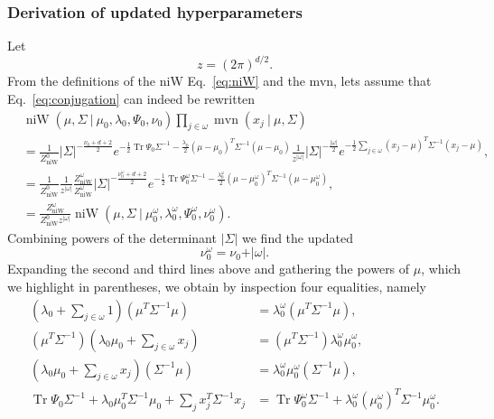 \documentclass[11pt, oneside]{article}   	%
\DeclareMathOperator{\Tr}{Tr}
\DeclareMathOperator{\niW}{niW}
\begin{document}
\subsubsection{Derivation of updated hyperparameters}
Let
$$z = (2\pi)^{d/2}.$$
From the definitions of the niW Eq.~\ref{eq:niW} and the mvn, lets assume that Eq.~\ref{eq:conjugation} can indeed be rewritten
\begin{equation}\begin{split}
&\niW(\mu, \Sigma~\vert~ \mu_0, \lambda_0,\Psi_0,\nu_0)\prod_{j\in\omega}\operatorname{mvn}(x_j~\vert~\mu,\Sigma)\\
& = \frac{1}{Z^0_{\niW}}\vert\Sigma\vert^{-\frac{\nu_0 + d + 2}{2}} e^{-\frac{1}{2}\Tr\Psi_0\Sigma^{-1}-\frac{\lambda_0}{2}(\mu - \mu_0)^T \Sigma^{-1}(\mu - \mu_0)}\frac{1}{z^{\vert\omega\vert}}\vert\Sigma\vert^{-\frac{\vert\omega\vert}{2}} e^{-\frac{1}{2}\sum_{j\in\omega}(x_j - \mu)^T\Sigma^{-1}(x_j - \mu)},\\
&=  \frac{1}{Z^0_{\niW}}\frac{1}{z^{\vert\omega\vert}} \frac{Z^\omega_{\niW}}{Z^\omega_{\niW}}\vert\Sigma\vert^{-\frac{\nu_0^\omega + d + 2}{2}}e^{-\frac{1}{2}\Tr\Psi_0^\omega\Sigma^{-1} - \frac{\lambda_0^\omega}{2}(\mu - \mu_0^\omega)^T\Sigma^{-1}(\mu - \mu_0^\omega)},\\
&= \frac{Z^\omega_{\niW}}{Z^0_{\niW} z^{\vert\omega\vert}} \niW(\mu,\Sigma~\vert~\mu_0^\omega,\lambda_0^\omega,\Psi_0^\omega,\nu_0^\omega).
\label{eq:niW}\end{split}\end{equation}
Combining powers of the determinant $\vert\Sigma\vert$ we find the updated
$$\nu_0^\omega = \nu_0 + \vert\omega\vert.$$
Expanding the second and third lines above and gathering the powers of $\mu$, which we highlight in parentheses, we obtain by inspection four equalities, namely
\begin{equation}\begin{split}
(\lambda_0 + \sum_{j\in\omega} 1)\left(\mu^T\Sigma^{-1}\mu\right) &= \lambda_0^\omega\left(\mu^T\Sigma^{-1}\mu\right),\\
\left(\mu^T\Sigma^{-1}\right)(\lambda_0\mu_0 + \sum_{j\in\omega} x_j ) &= \left(\mu^T\Sigma^{-1}\right)\lambda_0^\omega \mu_0^\omega,\\
(\lambda_0\mu_0 + \sum_{j\in\omega} x_j)\left(\Sigma^{-1}\mu\right) &= \lambda_0^\omega \mu_0^\omega\left(\Sigma^{-1}\mu\right),\\
\Tr\Psi_0\Sigma^{-1} + \lambda_0\mu_0^T\Sigma^{-1}\mu_0 + \sum_j x_j^T\Sigma^{-1} x_j &= \Tr\Psi_0^\omega\Sigma^{-1} + \lambda_0^\omega(\mu_0^\omega)^T\Sigma^{-1}\mu_0^\omega.
\end{split}\end{equation}
\end{document}
